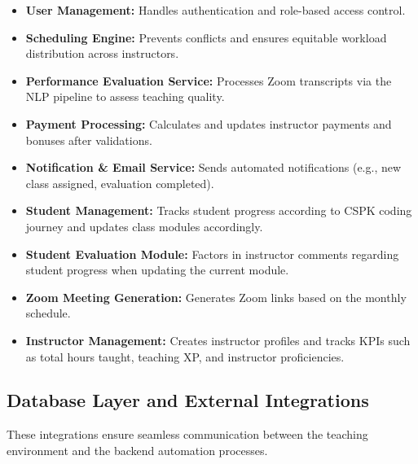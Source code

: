 \begin{itemize}
    \item \textbf{User Management:} Handles authentication and role-based access control.
    \item \textbf{Scheduling Engine:} Prevents conflicts and ensures equitable workload distribution across instructors.
    \item \textbf{Performance Evaluation Service:} Processes Zoom transcripts via the NLP pipeline to assess teaching quality.
    \item \textbf{Payment Processing:} Calculates and updates instructor payments and bonuses after validations.
    \item \textbf{Notification \& Email Service:} Sends automated notifications (e.g., new class assigned, evaluation completed).
    \item \textbf{Student Management:} Tracks student progress according to CSPK coding journey and updates class modules accordingly.
    \item \textbf{Student Evaluation Module:} Factors in instructor comments regarding student progress when updating the current module.
    \item \textbf{Zoom Meeting Generation:} Generates Zoom links based on the monthly schedule.
    \item \textbf{Instructor Management:} Creates instructor profiles and tracks KPIs such as total hours taught, teaching XP, and instructor proficiencies.
\end{itemize}

\subsection{Database Layer and External Integrations}

These integrations ensure seamless communication between the teaching environment and the backend automation processes.

